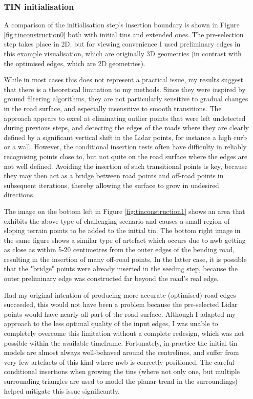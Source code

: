 \subsubsection{TIN initialisation}

A comparison of the initialisation step's insertion boundary is shown in Figure \ref{fig:tinconstruction0} both with initial \ac{tin}s and extended ones. The pre-selection step takes place in 2D, but for viewing convenience I used preliminary edges in this example visualisation, which are originally 3D geometries (in contrast with the optimised edges, which are 2D geometries).

While in most cases this does not represent a practical issue, my results suggest that there is a theoretical limitation to my methods. Since they were inspired by ground filtering algorithms, they are not particularly sensitive to gradual changes in the road surface, and especially insensitive to smooth transitions. The approach appears to excel at eliminating outlier points that were left undetected during previous steps, and detecting the edges of the roads where they are clearly defined by a significant vertical shift in the Lidar points, for instance a high curb or a wall. However, the conditional insertion tests often have difficulty in reliably recognising points close to, but not quite on the road surface where the edges are not well defined. Avoiding the insertion of such transitional points is key, because they may then act as a bridge between road points and off-road points in subsequent iterations, thereby allowing the surface to grow in undesired directions.

The image on the bottom left in Figure \ref{fig:tinconstruction1} shows an area that exhibits the above type of challenging scenario and causes a small region of sloping terrain points to be added to the initial \ac{tin}. The bottom right image in the same figure shows a similar type of artefact which occurs due to \ac{nwb} getting as close as within 5-20 centimetres from the outer edges of the bending road, resulting in the insertion of many off-road points. In the latter case, it is possible that the "bridge" points were already inserted in the seeding step, because the outer preliminary edge was constructed far beyond the road's real edge.

Had my original intention of producing more accurate (optimised) road edges succeeded, this would not have been a problem because the pre-selected Lidar points would have nearly all part of the road surface. Although I adapted my approach to the less optimal quality of the input edges, I was unable to completely overcome this limitation without a complete redesign, which was not possible within the available timeframe. Fortunately, in practice the initial \ac{tin} models are almost always well-behaved around the centrelines, and suffer from very few artefacts of this kind where \ac{nwb} is correctly positioned. The careful conditional insertions when growing the \ac{tin}s (where not only one, but multiple surrounding triangles are used to model the planar trend in the surroundings) helped mitigate this issue significantly.

